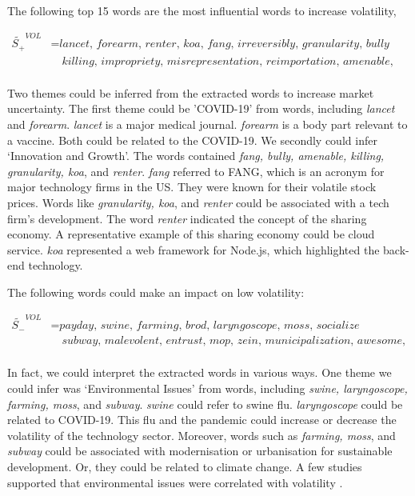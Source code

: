\documentclass[logo,bsc,singlespacing,parskip]{infthesis}
\begin{document}
The following top 15 words are the most influential words to increase volatility, 

\begin{align*}
\tilde{S_{+}}^{VOL} &= \textit{lancet, forearm, renter, koa, fang, irreversibly, granularity, bully} \\
               &\quad \textit{killing, impropriety, misrepresentation, reimportation, amenable, sayer, spoof} \\
\end{align*}

Two themes could be inferred from the extracted words to increase market uncertainty. The first theme could be 'COVID-19' from words, including \textit{lancet} and \textit{forearm}. \textit{lancet} is a major medical journal.
\textit{forearm} is a body part relevant to a vaccine. Both could be related to the COVID-19. We secondly could infer ‘Innovation and Growth’. The words contained \textit{fang, bully, amenable, killing, granularity, koa}, and \textit{renter}. \textit{fang} referred to FANG, which is an acronym for major technology firms in the US. They were known for their volatile stock prices. Words like \textit{granularity, koa}, and \textit{renter} could be associated with a tech firm’s development. The word \textit{renter} indicated the concept of the sharing economy. A representative example of this sharing economy could be cloud service. \textit{koa} represented a web framework for Node.js, which highlighted the back-end technology. 

The following words could make an impact on low volatility:

\begin{align*}
\tilde{S_{-}}^{VOL} &= \textit{payday, swine, farming, brod, laryngoscope, moss, socialize} \\
               &\quad \textit{subway, malevolent, entrust, mop, zein, municipalization, awesome, roller} \\
\end{align*}

In fact, we could interpret the extracted words in various ways. One theme we could infer was ‘Environmental Issues’ from words, including \textit{swine, laryngoscope, farming, moss}, and \textit{subway}. \textit{swine} could refer to swine flu. \textit{laryngoscope} could be related to COVID-19. This flu and the pandemic could increase or decrease the volatility of the technology sector. Moreover, words such as \textit{farming, moss}, and \textit{subway} could be associated with modernisation or urbanisation for sustainable development. Or, they could be related to climate change. A few studies supported that environmental issues were correlated with volatility \cite{Majeed2019, Majeed2021}.
\end{document}

